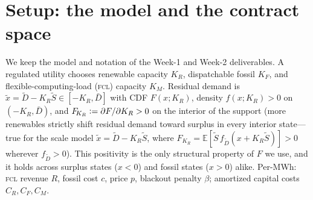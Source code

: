 \documentclass[11pt,reqno]{amsart}
\theoremstyle{plain}
\theoremstyle{definition}
\theoremstyle{remark}
\newcommand{\KR}{K_R}
\newcommand{\KF}{K_F}
\newcommand{\KM}{K_M}
\newcommand{\Dbar}{\bar D}
\newcommand{\CM}{C_M}
\newcommand{\CF}{C_F}
\newcommand{\CR}{C_R}
\newcommand{\FKR}{F_{\!\KR}}
\newcommand{\E}{\mathbb{E}}
\newcommand{\eqdef}{\vcentcolon=}
\begin{document}
\begin{abstract}
one-parameter family---grant the load a per-state fossil budget $\tau$, with $\tau=0$ the
surplus rule and $\tau\to\infty$ the naive rule. Profit rises with $\tau$ (proved), and
carbon-optimality of surplus-only reduces, by an \emph{exact identity}
$C(\tau)-C(0)=\Phi(\tau)(1-\Lambda(\tau))$, to a single \emph{leverage} condition
$\Lambda\le1$ (the reduction proved; at interior optima $\Lambda\in[0.14,0.22]$---the
induced build-out offsets roughly a fifth of the load's footprint, not all of it): the contracts trace a monotone carbon--profit frontier with \emph{no free
lunch}. So Weeks~2 and~3 are not rival models but the carbon-worst and carbon-best corners
of one optimal-contract family, the regulator's reliability and participation requirements
selecting the point between. Throughout, the core decarbonization is
\emph{distributionally robust}: it holds for the worst-case demand law over the regularity
class, so the regulator needs no knowledge of $F$. Every identity is
checked against quadrature in \texttt{verify\_week3.py}. The message is clean: a flexible
computing load is a decarbonization instrument, and contract design is the lever that
makes it one.
\end{abstract}

\maketitle

\section{Setup: the model and the contract space}\label{sec:setup}

We keep the model and notation of the Week-1 and Week-2 deliverables. A regulated
utility chooses renewable capacity $\KR$, dispatchable fossil $\KF$, and
flexible-computing-load (\textsc{fcl}) capacity $\KM$. Residual demand is
$\tilde x=\tilde D-\KR\tilde S\in[-\KR,\Dbar]$ with CDF $F(x;\KR)$, density
$f(x;\KR)>0$ on $(-\KR,\Dbar)$, and $\FKR\eqdef\partial F/\partial\KR>0$ on the
interior of the support (more renewables strictly shift residual demand toward surplus
in every interior state---true for the scale model $\tilde x=\tilde D-\KR\tilde S$,
where $\FKR=\E[\tilde S\,f_{\tilde D}(x+\KR\tilde S)]>0$ wherever $f_{\tilde D}>0$). This
positivity is the only structural property of $F$ we use, and it holds across surplus
states ($x<0$) and fossil states ($x>0$) alike. Per-MWh: \textsc{fcl} revenue $R$,
fossil cost $c$, price $p$, blackout penalty $\beta$; amortized capital costs
$\CR,\CF,\CM$.
\end{document}
